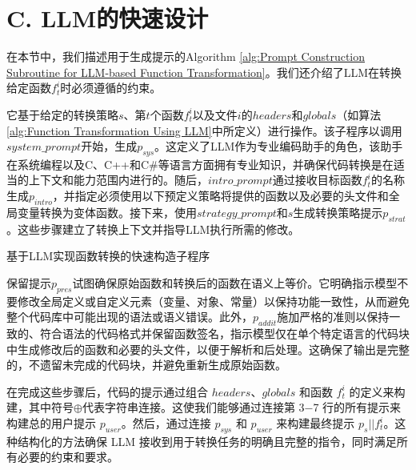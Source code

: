 \section{C. LLM的快速设计}
在本节中，我们描述用于生成提示的Algorithm \ref{alg:Prompt Construction Subroutine for LLM-based Function Transformation}。我们还介绍了LLM在转换给定函数$f_{t}^{i}$时必须遵循的约束。

它基于给定的转换策略$s$、第$t$个函数$f_{t}^{i}$以及文件$i$的$headers$和$globals$（如算法\ref{alg:Function Transformation Using LLM}中所定义）进行操作。该子程序以调用$system\_prompt$开始，生成$p_{sys}$。这定义了LLM作为专业编码助手的角色，该助手在系统编程以及C、C++和C\#等语言方面拥有专业知识，并确保代码转换是在适当的上下文和能力范围内进行的。随后，$intro\_prompt$通过接收目标函数$f_{t}^{i}$的名称生成$p_{intro}$，并指定必须使用以下预定义策略将提供的函数以及必要的头文件和全局变量转换为变体函数。接下来，使用$strategy\_prompt$和$s$生成转换策略提示$p_{strat}$。这些步骤建立了转换上下文并指导LLM执行所需的修改。

\begin{algorithm}[htbp]
	\caption{基于LLM实现函数转换的快速构造子程序\label{alg:Prompt Construction Subroutine for LLM-based Function Transformation}}
\end{algorithm}

保留提示$p_{pres}$试图确保原始函数和转换后的函数在语义上等价。它明确指示模型不要修改全局定义或自定义元素（变量、对象、常量）以保持功能一致性，从而避免整个代码库中可能出现的语法或语义错误。此外，$p_{addit}$施加严格的准则以保持一致的、符合语法的代码格式并保留函数签名，指示模型仅在单个特定语言的代码块中生成修改后的函数和必要的头文件，以便于解析和后处理。这确保了输出是完整的，不遗留未完成的代码块，并避免重新生成原始函数。

在完成这些步骤后，代码的提示通过组合 $headers$、$globals$ 和函数 $f_{t}^{i}$ 的定义来构建，其中符号$\oplus$代表字符串连接。这使我们能够通过连接第 3−7 行的所有提示来构建总的用户提示 $p_{user}$。然后，通过连接 $p_{sys}$ 和 $p_{user}$ 来构建最终提示 $p_{s}||f_{t}^{i}$。这种结构化的方法确保 LLM 接收到用于转换任务的明确且完整的指令，同时满足所有必要的约束和要求。